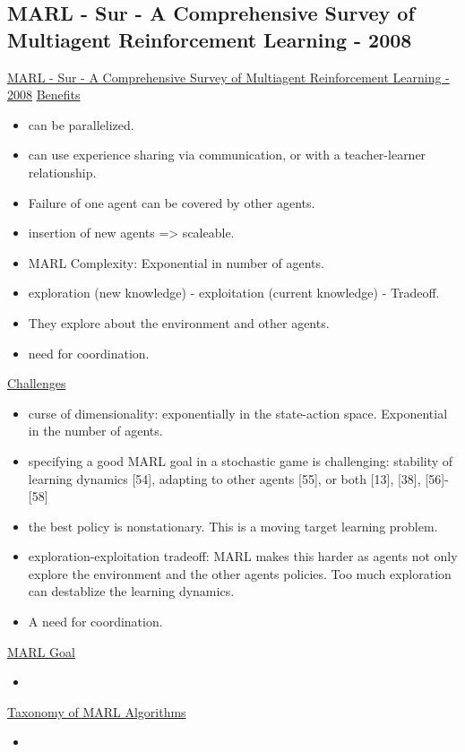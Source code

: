 \subsection{MARL - Sur - A Comprehensive Survey of Multiagent Reinforcement Learning - 2008}
\href{https://ieeexplore.ieee.org/abstract/document/4445757}{MARL - Sur - A Comprehensive Survey of Multiagent Reinforcement Learning - 2008}
\underline{Benefits}
\begin{itemize}[noitemsep,nolistsep]
	\item can be parallelized.
	\item can use experience sharing via communication, or with a teacher-learner relationship.
	\item Failure of one agent can be covered by other agents.
	\item insertion of new agents => scaleable.
	\item MARL Complexity: Exponential in number of agents.
	\item exploration (new knowledge) - exploitation (current knowledge) - Tradeoff.
	\item They explore about the environment and other agents.
	\item need for coordination.
\end{itemize}
\underline{Challenges}
\begin{itemize}[noitemsep,nolistsep]
	\item curse of dimensionality: exponentially in the state-action space. Exponential in the number of agents.
	\item specifying a good MARL goal in a stochastic game is challenging: stability of learning dynamics [54], adapting to other agents [55], or both [13], [38], [56]-[58]
	\item the best policy is nonstationary. This is a moving target learning problem.
	\item exploration-exploitation tradeoff: MARL makes this harder as agents not only explore the environment and the other agents policies. Too much exploration can destablize the learning dynamics.
	\item A need for coordination.
\end{itemize}
\underline{MARL Goal}
\begin{itemize}[noitemsep,nolistsep]
	\item 
\end{itemize}
\underline{Taxonomy of MARL Algorithms}
\begin{itemize}[noitemsep,nolistsep]
	\item 
\end{itemize}
